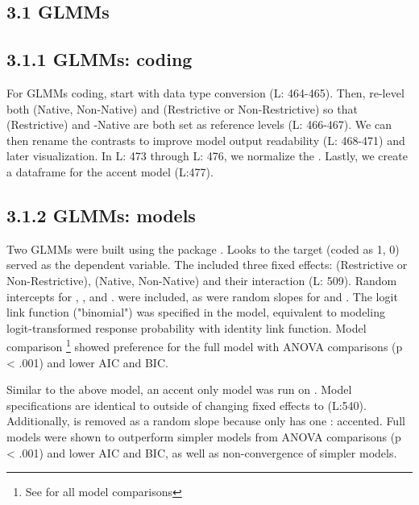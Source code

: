 \subsection{3.1 GLMMs}
\subsection{3.1.1 GLMMs: coding}
For GLMMs coding, start with data type conversion (L: 464-465). Then, re-level both (Native, Non-Native) and (Restrictive or Non-Restrictive) so that (Restrictive) and -Native are both set as reference levels (L: 466-467).  We can then rename the contrasts to improve model output readability (L: 468-471) and later visualization. In L: 473 through L: 476, we normalize the . Lastly, we create a dataframe for the accent model (L:477).



\subsection{3.1.2 GLMMs: models}

Two GLMMs were built using the  package \parencite{Bates2014-eq}. Looks to the target (coded as 1, 0) served as the dependent variable. The  included three fixed effects:  (Restrictive or Non-Restrictive), (Native, Non-Native) and their interaction (L: 509). Random intercepts for ,
, and
.
 were included, as were random slopes for  and . The logit link function ("binomial") was specified in the model, equivalent to modeling logit-transformed response probability with identity link function. Model comparison \footnote{See  for all model comparisons} showed preference for the full model with ANOVA comparisons (p < .001) and lower AIC and BIC. 



Similar to the above model, an accent only model was run on . Model specifications are identical to  outside of changing fixed effects to  (L:540). Additionally,  is removed as a random slope because  only has one : accented. Full models were shown to outperform simpler models from  ANOVA comparisons (p < .001) and lower AIC and BIC, as well as non-convergence of simpler models. 

